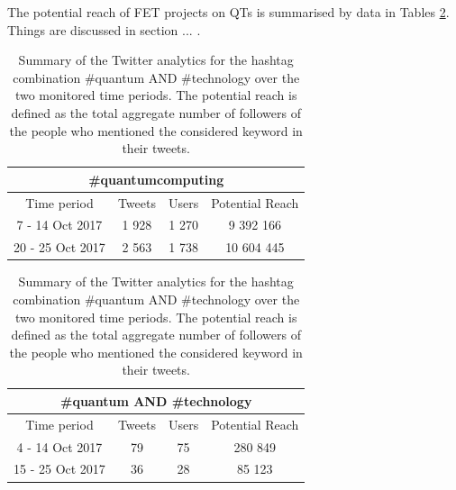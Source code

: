 The potential reach of FET projects on QTs is summarised by data in Tables \ref{Summary_QuantumComputing-Technology}. Things are discussed in section ... .

\begin{table}[t]
 \begin{center}
 
  \begin{tabular}{cccc}
   \hline 
   \hline
   \multicolumn{4}{c}{\#quantumcomputing}\\
   \hline
   \hline
   Time period & Tweets & Users & Potential Reach \\ 
   \hline
   7 - 14 Oct 2017 & 1 928 & 1 270 & 9 392 166  \\
   20 - 25 Oct 2017 & 2 563 & 1 738 & 10 604 445  \\
   \hline
   \hline
  \end{tabular}

  \bigskip

  \begin{tabular}{cccc}
   \hline 
   \hline
   \multicolumn{4}{c}{\#quantum AND \#technology}\\
   \hline 
   \hline
   Time period & Tweets & Users & Potential Reach \\ 
   \hline
   4 - 14 Oct 2017 & 79 & 75 & 280 849  \\
   15 - 25 Oct 2017 & 36 & 28 & 85 123  \\
   \hline
   \hline
  \end{tabular}
 \end{center} 
 \caption{Summary of the Twitter analytics for the hashtag combination \#quantum AND \#technology over the two monitored time periods. The potential reach is defined as the total aggregate number of followers of the people who mentioned the considered keyword in their tweets.}
\label{Summary_QuantumComputing-Technology} 
\end{table}    

